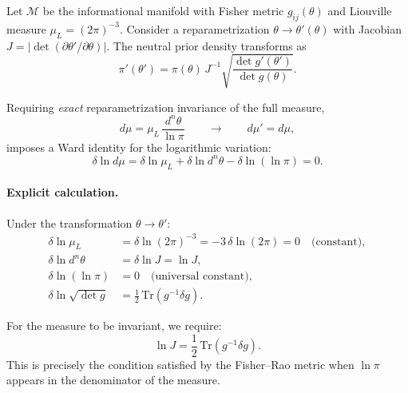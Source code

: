 \documentclass{article}
\numberwithin{equation}{section}
\theoremstyle{plain}
\theoremstyle{definition}
\theoremstyle{remark}
\begin{document}
Let $\mathcal{M}$ be the informational manifold with Fisher metric $g_{ij}(\theta)$ and Liouville measure $\mu_L=(2\pi)^{-3}$. Consider a reparametrization $\theta\!\to\!\theta'(\theta)$ with Jacobian $J=|\det(\partial\theta'/\partial\theta)|$. The neutral prior density transforms as
\begin{equation}
\pi'(\theta') = \pi(\theta)\, J^{-1} \sqrt{\frac{\det g'(\theta')}{\det g(\theta)}}.
\end{equation}

Requiring \emph{exact} reparametrization invariance of the full measure,
\begin{equation}
d\mu = \mu_L\,\frac{d^n\theta}{\ln\pi}
\qquad\longrightarrow\qquad
d\mu' = d\mu,
\end{equation}
imposes a Ward identity for the logarithmic variation:
\begin{equation}
\delta\ln d\mu = \delta\ln\mu_L + \delta\ln d^n\theta - \delta\ln(\ln\pi) = 0.
\label{eq:ward_log}
\end{equation}

\paragraph{Explicit calculation.}
Under the transformation $\theta \to \theta'$:
\begin{align}
\delta\ln\mu_L &= \delta\ln(2\pi)^{-3} = -3\,\delta\ln(2\pi) = 0 \quad \text{(constant)}, \\
\delta\ln d^n\theta &= \delta\ln J = \ln J, \\
\delta\ln(\ln\pi) &= 0 \quad \text{(universal constant)}, \\
\delta\ln\sqrt{\det g} &= \frac{1}{2}\,\mathrm{Tr}\left(g^{-1}\delta g\right).
\end{align}

For the measure to be invariant, we require:
\begin{equation}
\ln J = \frac{1}{2}\,\mathrm{Tr}\left(g^{-1}\delta g\right).
\label{eq:jacobian_fisher}
\end{equation}
This is precisely the condition satisfied by the Fisher--Rao metric when $\ln\pi$ appears in the denominator of the measure.
\end{document}
